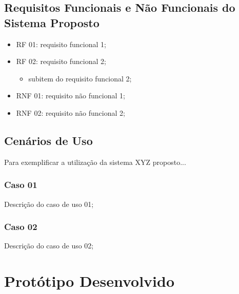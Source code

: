 \subsection{Requisitos Funcionais e Não Funcionais do Sistema Proposto}
\label{ss_c4_RF_RNF}

\begin{itemize}
    \item RF 01: requisito funcional 1;
    \item RF 02: requisito funcional 2;
    \begin{itemize}
        \item subitem do requisito funcional 2;        
    \end{itemize}    
\end{itemize}


\begin{itemize}
    \item RNF 01: requisito não funcional 1;
    \item RNF 02: requisito não funcional 2;
\end{itemize}


\subsection{Cenários de Uso}
\label{ss_c4_cenario-uso}

Para exemplificar a utilização da sistema XYZ proposto...


\subsubsection{Caso 01}
\label{sss_c4_caso-01}

Descrição do caso de uso 01;



\subsubsection{Caso 02}
\label{sss_c4_caso-02}

Descrição do caso de uso 02;



\section{Protótipo Desenvolvido}
\label{s_c4_prototipo}


